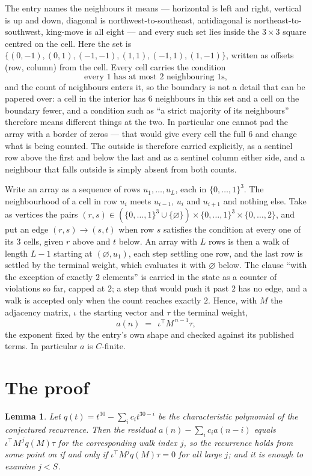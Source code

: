 \documentclass[11pt,a4paper]{article}
\theoremstyle{plain}
\newtheorem{lemma}[theorem]{Lemma}
\theoremstyle{definition}
\begin{document}
The entry names the neighbours it means --- horizontal is left and right, vertical is up and
down, diagonal is northwest-to-southeast, antidiagonal is northeast-to-southwest, king-move is
all eight --- and every such set lies inside the $3\times3$ square centred on the cell. Here
the set is $\{(0,-1), (0,1), (-1,-1), (1,1), (-1,1), (1,-1)\}$, written as offsets (row, column) from the cell. Every cell carries
the condition
\[
\text{every 1 has at most 2 neighbouring 1s},
\]
and the count of neighbours enters it, so the boundary is not a detail that can be papered
over: a cell in the interior has $6$ neighbours in this set and a cell on the boundary
fewer, and a condition such as ``a strict majority of its neighbours'' therefore means
different things at the two. In particular one cannot pad the array with a border of zeros ---
that would give every cell the full $6$ and change what is being counted. The outside is
therefore carried
explicitly, as a sentinel row above the first and below the last and as a sentinel column
either side, and a neighbour that falls outside is simply absent from both counts.

Write an array as a sequence of rows $u_1,\dots,u_L$, each in
$\{0,\dots,1\}^{3}$. The neighbourhood of a cell in row $u_i$ meets $u_{i-1}$,
$u_i$ and $u_{i+1}$ and nothing else. Take as vertices the pairs
$(r,s)\in(\{0,\dots,1\}^{3}\cup\{\varnothing\})\times\{0,\dots,1\}^{3} \times \{0,\dots,2\}$,
and put an edge $(r,s)\to(s,t)$ when row $s$ satisfies the condition at every one of its
$3$ cells, given $r$ above and $t$ below. An array with $L$ rows is then a walk of length
$L-1$ starting at $(\varnothing,u_1)$, each step settling one row, and the last row is
settled by the terminal weight, which evaluates it with $\varnothing$ below. The clause ``with the exception of exactly $2$ elements'' is carried in
the state as a counter of violations so far, capped at $2$; a step that would push it past
$2$ has no edge, and a walk is accepted only when the count reaches exactly $2$. Hence,
with $M$ the adjacency matrix, $\iota$ the starting vector and $\tau$ the terminal weight,
\[
a(n)\;=\;\,\iota^{\!\top}M^{\,n-1}\tau ,
\]
the exponent fixed by the entry's own shape and checked against its published terms. In
particular $a$ is $C$-finite.

\section{The proof}

\begin{lemma}\label{lem:crit}
Let $q(t)=t^{30}-\sum_i c_it^{30-i}$ be the characteristic polynomial of the
conjectured recurrence. Then the residual $a(n)-\sum_ic_ia(n-i)$ equals
$\iota^{\!\top}M^{\,j}q(M)\tau$ for the corresponding walk index $j$, so the
recurrence holds from some point on if and only if $\iota^{\!\top}M^{j}q(M)\tau=0$ for all
large $j$; and it is enough to examine $j<S$.
\end{lemma}
\end{document}
